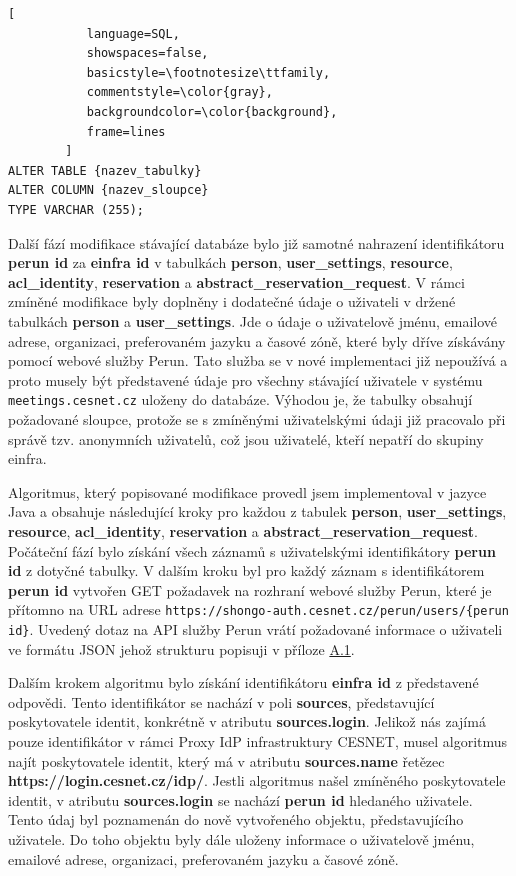 \documentclass[
  printed, %
  twoside, %
  table,   %
  nolof,     %
  nolot,     %
]{fithesis3}
\begin{document}
\begin{lstlisting}[
           language=SQL,
           showspaces=false,
           basicstyle=\footnotesize\ttfamily,
           commentstyle=\color{gray},
           backgroundcolor=\color{background},
           frame=lines
        ]
ALTER TABLE {nazev_tabulky}  
ALTER COLUMN {nazev_sloupce}
TYPE VARCHAR (255);
\end{lstlisting}

Další fází modifikace stávající databáze bylo již samotné nahrazení identifikátoru \textbf{perun id} za \textbf{einfra id} v tabulkách \textbf{person}, \textbf{user\_settings}, \textbf{resource}, \textbf{acl\_identity}, \textbf{reservation} a \textbf{abstract\_reservation\_request}. V rámci zmíněné modifikace byly doplněny i dodatečné údaje o uživateli v držené tabulkách \textbf{person} a \textbf{user\_settings}. Jde o údaje o uživatelově jménu, emailové adrese, organizaci, preferovaném jazyku a časové zóně, které byly dříve získávány pomocí webové služby Perun. Tato služba se v nové implementaci již nepoužívá a proto musely být představené údaje pro všechny stávající uživatele v systému \texttt{meetings.cesnet.cz} uloženy do databáze. Výhodou je, že tabulky obsahují požadované sloupce, protože se s zmíněnými uživatelskými údaji již pracovalo při správě tzv. anonymních uživatelů, což jsou uživatelé, kteří nepatří do skupiny einfra. 
\par

Algoritmus, který popisované modifikace provedl jsem implementoval v jazyce Java a obsahuje následující kroky pro každou z tabulek \textbf{person}, \textbf{user\_settings}, \textbf{resource}, \textbf{acl\_identity}, \textbf{reservation} a \textbf{abstract\_reservation\_request}. Počáteční fází bylo získání všech záznamů s uživatelskými identifikátory \textbf{perun id} z dotyčné tabulky. V dalším kroku byl pro každý záznam s identifikátorem \textbf{perun id} vytvořen GET požadavek na rozhraní webové služby Perun, které je přítomno na URL adrese \texttt{https://shongo-auth.cesnet.cz/perun/users/\{perun id\}}. Uvedený dotaz na API služby Perun vrátí požadované informace o uživateli ve formátu JSON jehož strukturu popisuji v příloze \hyperref[table:perunws:user]{A.1}.
\par
Dalším krokem algoritmu bylo získání identifikátoru \textbf{einfra id} z představené odpovědi. Tento identifikátor se nachází v poli \textbf{sources}, představující poskytovatele identit, konkrétně v atributu \textbf{sources.login}. Jelikož nás zajímá pouze identifikátor v rámci Proxy IdP infrastruktury CESNET, musel algoritmus najít poskytovatele identit, který má v atributu \textbf{sources.name} řetězec \textbf{https://login.cesnet.cz/idp/}. Jestli algoritmus našel zmíněného poskytovatele identit, v atributu \textbf{sources.login} se nachází \textbf{perun id} hledaného uživatele. Tento údaj byl poznamenán do nově vytvořeného objektu, představujícího uživatele. Do toho objektu byly dále uloženy informace o uživatelově jménu, emailové adrese, organizaci, preferovaném jazyku a časové zóně. 
\end{document}
